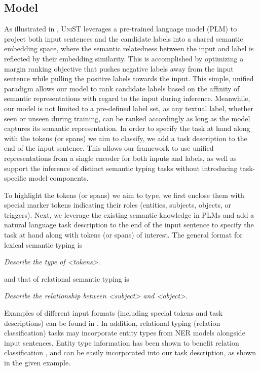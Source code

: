 \documentclass[11pt]{article}
\newcommand{\model}{\textsc{UniST}\xspace}
\newcommand{\stitle}[1]{\vspace{1ex} \noindent{\bf #1}}
\begin{document}
\subsection{Model} \label{model}
\stitle{Overview.} 
As illustrated in , \model leverages a pre-trained language model (PLM) to project both input sentences and the candidate labels into a shared semantic embedding space, where the semantic relatedness between the input and label is reflected by their embedding similarity. This is accomplished by optimizing a margin ranking objective that pushes negative labels away from the input sentence while pulling the positive labels towards the input. This simple, unified paradigm allows our model to rank candidate labels based on the affinity of semantic representations with regard to the input during inference. Meanwhile, our model is not limited to a pre-defined label set, as any textual label, whether seen or unseen during training, can be ranked accordingly as long as the model captures its semantic representation. In order to specify the task at hand along with the tokens (or spans) we aim to classify, we add a task description to the end of the input sentence. This allows our framework to use unified representations from a single encoder for both inputs and labels, as well as support the inference of distinct semantic typing tasks without introducing task-specific model components.



\stitle{Task Description.} To highlight the tokens (or spans) we aim to type, we first enclose them with special marker tokens indicating their roles (entities, subjects, objects, or triggers). Next, we leverage the existing semantic knowledge in PLMs and add a natural language task description to the end of the input sentence to specify the task at hand along with tokens (or spans) of interest. The general format for lexical semantic typing is 
\begin{tcolorbox}
\vspace{-0.5em}
\small
        \textit{Describe the type of <tokens>}.
\vspace{-0.5em}
\end{tcolorbox}
\noindent and that of relational semantic typing is
\begin{tcolorbox}
\vspace{-0.5em}
\small
        \textit{Describe the relationship between <subject> and <object>}.
\vspace{-0.5em}
\end{tcolorbox}
\noindent
Examples of different input formats (including special tokens and task descriptions) can be found in . In addition, relational typing (relation classification) tasks may incorporate entity types from NER models alongside input sentences. Entity type information has been shown to benefit relation classification \cite{peng-etal-2020-learning,zhong-chen-2021-frustratingly,zhou2021improved}, and can be easily incorporated into our task description, as shown in the given example. 
\end{document}

